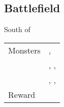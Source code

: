 \subsection{Battlefield}
\label{map:battlefield_06}

South of 

\begin{longtable}{ l p{9cm} }
	Monsters
	& \nameref{monster:scorpion}, \nameref{monster:scorpion} \\
	& \nameref{monster:giant_toad}, \nameref{monster:giant_toad}, \nameref{monster:mint_mint} \\
	& \nameref{monster:scorpion}, \nameref{monster:scorpion}, \nameref{monster:mint_mint}
\\
	Reward & \nameref{armor:magic_ring}
\end{longtable}
